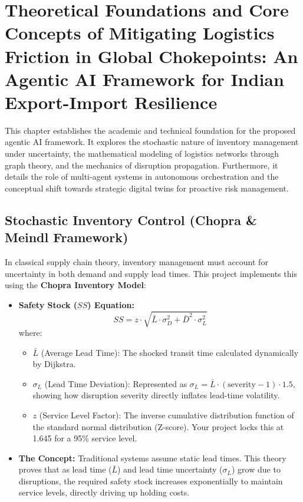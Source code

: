 \chapter{Theoretical Foundations and Core Concepts of Mitigating Logistics Friction in Global Chokepoints:
An Agentic AI Framework for Indian Export-Import
Resilience}

This chapter establishes the academic and technical foundation for the proposed agentic AI framework. It explores the stochastic nature of inventory management under uncertainty, the mathematical modeling of logistics networks through graph theory, and the mechanics of disruption propagation. Furthermore, it details the role of multi-agent systems in autonomous orchestration and the conceptual shift towards strategic digital twins for proactive risk management.

\section{Stochastic Inventory Control (Chopra \& Meindl Framework)}
In classical supply chain theory, inventory management must account for uncertainty in both demand and supply lead times. This project implements this using the \textbf{Chopra Inventory Model}:

\begin{itemize}
    \item \textbf{Safety Stock ($SS$) Equation:}
    \[SS = z \cdot \sqrt{\bar{L} \cdot \sigma_D^2 + \bar{D}^2 \cdot \sigma_L^2}\]
    where:
    \begin{itemize}
        \item $\bar{L}$ (Average Lead Time): The shocked transit time calculated dynamically by Dijkstra.
        \item $\sigma_L$ (Lead Time Deviation): Represented as $\sigma_L = \bar{L} \cdot (\text{severity} - 1) \cdot 1.5$, showing how disruption severity directly inflates lead-time volatility.
        \item $z$ (Service Level Factor): The inverse cumulative distribution function of the standard normal distribution (Z-score). Your project locks this at 1.645 for a 95\% service level.
    \end{itemize}
    \item \textbf{The Concept:} Traditional systems assume static lead times. This theory proves that as lead time ($\bar{L}$) and lead time uncertainty ($\sigma_L$) grow due to disruptions, the required safety stock increases exponentially to maintain service levels, directly driving up holding costs.
\end{itemize}

